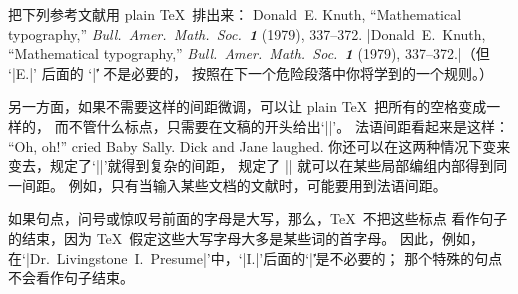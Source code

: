 \exercise 把下列参考文献用 plain \TeX\ 排出来：
Donald~E. {Knuth}, ``Mathematical typography,'' {\sl Bull.\
Amer.\ Math.\ Soc.\ \bf1} (1979), 337--372.
\answer |Donald~E.\ Knuth, ``Mathematical typography,'' {\sl Bull.\
Amer.\ Math.\ Soc.\ \bf1} (1979), 337--372.|（但 `|E.|' 后面的 `|\|' 不是必要的，
按照在下一个危险段落中你将学到的一个规则。）

另一方面，如果不需要这样的间距微调，可以让 plain \TeX\ 把所有的空格变成一样的，
而不管什么标点，只需要在文稿的开头给出`|\frenchspacing|'。%
法语间距看起来是这样：
\begindisplay \frenchspacing
``Oh, oh!'' cried Baby Sally. Dick and Jane laughed.
\enddisplay
你还可以在这两种情况下变来变去，规定了`|\nonfrenchspacing|'就得到复杂的间距，
规定了 |\frenchspacing| 就可以在某些局部编组内部得到同一间距。%
例如，只有当输入某些文档的文献时，可能要用到法语间距。

\danger 如果句点，问号或惊叹号前面的字母是大写，那么，\TeX\ 不把这些标点%
看作句子的结束，因为 \TeX\ 假定这些大写字母大多是某些词的首字母。%
因此，例如，在`|Dr.~Livingstone~I.\ Presume|'中，`|I.|'后面的`|\|'是不必要的；
那个特殊的句点不会看作句子结束。

